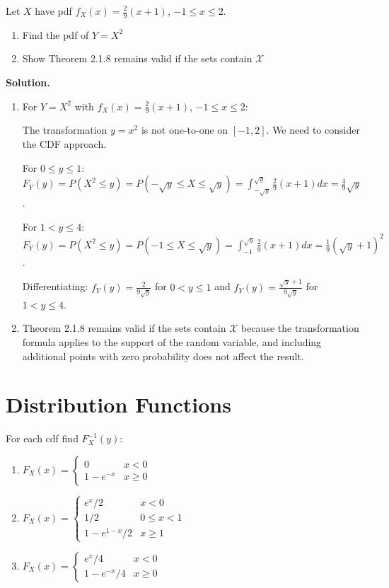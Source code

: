 \begin{problembox}
Let $X$ have pdf $f_X(x) = \frac{2}{9}(x+1)$, $-1 \leq x \leq 2$.
\begin{enumerate}[label=(\alph*)]
    \item Find the pdf of $Y = X^2$
    \item Show Theorem 2.1.8 remains valid if the sets contain $\mathcal{X}$
\end{enumerate}
\end{problembox}

\noindent\textbf{Solution.}
\begin{enumerate}[label=(\alph*)]
    \item For $Y = X^2$ with $f_X(x) = \frac{2}{9}(x+1)$, $-1 \leq x \leq 2$:
    
    The transformation $y = x^2$ is not one-to-one on $[-1,2]$. We need to consider the CDF approach.
    
    For $0 \leq y \leq 1$: $F_Y(y) = P(X^2 \leq y) = P(-\sqrt{y} \leq X \leq \sqrt{y}) = \int_{-\sqrt{y}}^{\sqrt{y}} \frac{2}{9}(x+1)dx = \frac{4}{9}\sqrt{y}$.
    
    For $1 < y \leq 4$: $F_Y(y) = P(X^2 \leq y) = P(-1 \leq X \leq \sqrt{y}) = \int_{-1}^{\sqrt{y}} \frac{2}{9}(x+1)dx = \frac{1}{9}(\sqrt{y}+1)^2$.
    
    Differentiating: $f_Y(y) = \frac{2}{9\sqrt{y}}$ for $0 < y \leq 1$ and $f_Y(y) = \frac{\sqrt{y}+1}{9\sqrt{y}}$ for $1 < y \leq 4$.
    
    \item Theorem 2.1.8 remains valid if the sets contain $\mathcal{X}$ because the transformation formula applies to the support of the random variable, and including additional points with zero probability does not affect the result.
\end{enumerate}

\section{Distribution Functions}

\begin{problembox}
For each cdf find $F_X^{-1}(y)$:
\begin{enumerate}[label=(\alph*)]
    \item $F_X(x) = \begin{cases} 0 & x<0 \\ 1-e^{-x} & x\geq 0 \end{cases}$
    \item $F_X(x) = \begin{cases} e^x/2 & x<0 \\ 1/2 & 0\leq x<1 \\ 1-e^{1-x}/2 & x\geq 1 \end{cases}$
    \item $F_X(x) = \begin{cases} e^x/4 & x<0 \\ 1-e^{-x}/4 & x\geq 0 \end{cases}$
\end{enumerate}
\end{problembox}

